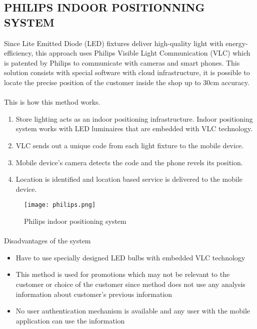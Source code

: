 \subsection{PHILIPS INDOOR POSITIONNING SYSTEM}
Since Lite Emitted Diode (LED) fixtures deliver high-quality light with energy-efficiency, this approach uses Philips Visible Light Communication (VLC) which is patented by Philips to communicate with cameras and smart phones. This solution consists with special software with cloud infrastructure, it is possible to locate the precise position of the customer inside the shop up to 30cm accuracy.\cite{philips}

\paragraph{}
This is how this method works.\cite{philips_3}
	\begin{enumerate}
		\item  Store lighting acts as an indoor positioning infrastructure. Indoor positioning system works with LED luminaires that are embedded with VLC technology. 
		\item VLC sends out a unique code from each light fixture to the mobile device.
		\item Mobile device's camera detects the code and the phone revels its position.
		\item Location is identified and location based service is delivered to the mobile device.
	\end{enumerate}
		\begin{figure*}[h]	
			\centering
			\texttt{[image: philips.png]}
			\caption{Philips indoor positioning system}
		\end{figure*}

\newpage
\paragraph{}
Disadvantages of the system
	\begin{itemize}
		\item Have to use specially designed LED bulbs with embedded VLC technology
		\item This method is used for promotions which may not be relevant to the customer or choice of the customer since method does not use any analysis information about customer's previous information
		\item No user authentication mechanism is available and any user with the mobile application can use the information
	\end{itemize}

